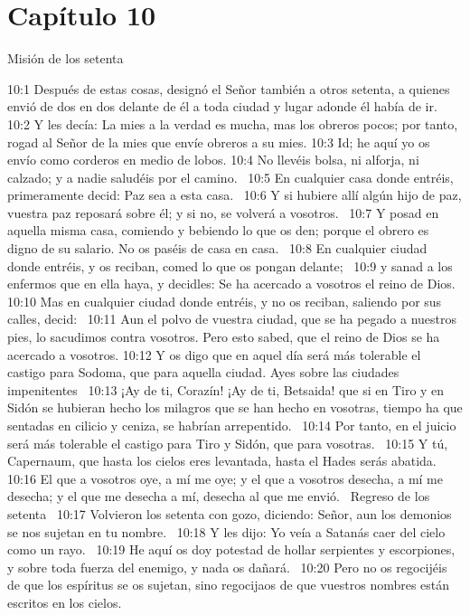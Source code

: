 \section*{Capítulo 10}
Misión de los setenta  

10:1 Después de estas cosas, designó el Señor también a otros setenta, a quienes envió de dos en dos delante de él a toda ciudad y lugar adonde él había de ir.  
10:2 Y les decía: La mies a la verdad es mucha, mas los obreros pocos; por tanto, rogad al Señor de la mies que envíe obreros a su mies. 
10:3 Id; he aquí yo os envío como corderos en medio de lobos. 
10:4 No llevéis bolsa, ni alforja, ni calzado; y a nadie saludéis por el camino.  
10:5 En cualquier casa donde entréis, primeramente decid: Paz sea a esta casa.  
10:6 Y si hubiere allí algún hijo de paz, vuestra paz reposará sobre él; y si no, se volverá a vosotros.  
10:7 Y posad en aquella misma casa, comiendo y bebiendo lo que os den; porque el obrero es digno de su salario. No os paséis de casa en casa.  
10:8 En cualquier ciudad donde entréis, y os reciban, comed lo que os pongan delante;  
10:9 y sanad a los enfermos que en ella haya, y decidles: Se ha acercado a vosotros el reino de Dios.  
10:10 Mas en cualquier ciudad donde entréis, y no os reciban, saliendo por sus calles, decid:  
10:11 Aun el polvo de vuestra ciudad, que se ha pegado a nuestros pies, lo sacudimos contra vosotros. Pero esto sabed, que el reino de Dios se ha acercado a vosotros. 
10:12 Y os digo que en aquel día será más tolerable el castigo para Sodoma, que para aquella ciudad. 
Ayes sobre las ciudades impenitentes   
10:13 ¡Ay de ti, Corazín! ¡Ay de ti, Betsaida! que si en Tiro y en Sidón se hubieran hecho los milagros que se han hecho en vosotras, tiempo ha que sentadas en cilicio y ceniza, se habrían arrepentido.  
10:14 Por tanto, en el juicio será más tolerable el castigo para Tiro y Sidón, que para vosotras.  
10:15 Y tú, Capernaum, que hasta los cielos eres levantada, hasta el Hades serás abatida. 
10:16 El que a vosotros oye, a mí me oye; y el que a vosotros desecha, a mí me desecha; y el que me desecha a mí, desecha al que me envió.  
Regreso de los setenta  
10:17 Volvieron los setenta con gozo, diciendo: Señor, aun los demonios se nos sujetan en tu nombre.  
10:18 Y les dijo: Yo veía a Satanás caer del cielo como un rayo.  
10:19 He aquí os doy potestad de hollar serpientes y escorpiones, y sobre toda fuerza del enemigo, y nada os dañará.  
10:20 Pero no os regocijéis de que los espíritus se os sujetan, sino regocijaos de que vuestros nombres están escritos en los cielos.  
